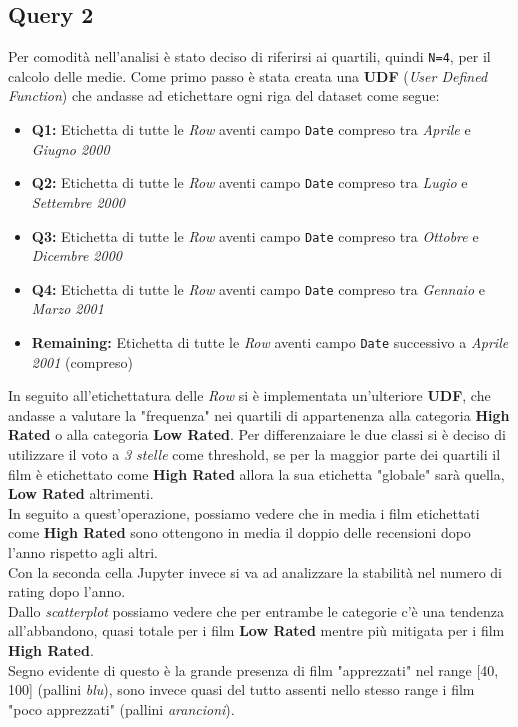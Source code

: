 \documentclass{article}
\begin{document}
    \newpage
    \subsection{Query 2}
        Per comodità nell'analisi è stato deciso di riferirsi ai quartili, quindi \texttt{N=4}, per il calcolo delle medie. Come primo passo è stata creata una \textbf{UDF} (\textit{User Defined Function}) che andasse ad etichettare ogni riga del dataset come segue:
        \begin{itemize}
            \item \textbf{Q1:} Etichetta di tutte le \textit{Row} aventi campo \texttt{Date} compreso tra \textit{Aprile} e \textit{Giugno 2000}
            \item \textbf{Q2:} Etichetta di tutte le \textit{Row} aventi campo \texttt{Date} compreso tra \textit{Lugio} e \textit{Settembre 2000}
            \item \textbf{Q3:} Etichetta di tutte le \textit{Row} aventi campo \texttt{Date} compreso tra \textit{Ottobre} e \textit{Dicembre 2000}
            \item \textbf{Q4:} Etichetta di tutte le \textit{Row} aventi campo \texttt{Date} compreso tra \textit{Gennaio} e \textit{Marzo 2001}
            \item \textbf{Remaining:} Etichetta di tutte le \textit{Row} aventi campo \texttt{Date} successivo a \textit{Aprile 2001} (compreso)
        \end{itemize}
        In seguito all'etichettatura delle \textit{Row} si è implementata un'ulteriore \textbf{UDF}, che andasse a valutare la "frequenza" nei quartili di appartenenza alla categoria \textbf{High Rated} o alla categoria \textbf{Low Rated}. Per differenzaiare le due classi si è deciso di utilizzare il voto a \textit{3 stelle} come threshold, se per la maggior parte dei quartili il film è etichettato come \textbf{High Rated} allora la sua etichetta "globale" sarà quella, \textbf{Low Rated} altrimenti.\\
        In seguito a quest'operazione, possiamo vedere che in media i film etichettati come \textbf{High Rated} sono ottengono in media il doppio delle recensioni dopo l'anno rispetto agli altri.\\
        Con la seconda cella Jupyter invece si va ad analizzare la stabilità nel numero di rating dopo l'anno.\\
        Dallo \textit{scatterplot} possiamo vedere che per entrambe le categorie c'è una tendenza all'abbandono, quasi totale per i film \textbf{Low Rated} mentre più mitigata per i film \textbf{High Rated}.\\
        Segno evidente di questo è la grande presenza di film "apprezzati" nel range [40, 100] (pallini \textit{blu}), sono invece quasi del tutto assenti nello stesso range i film "poco apprezzati" (pallini \textit{arancioni}).
    
\end{document}
